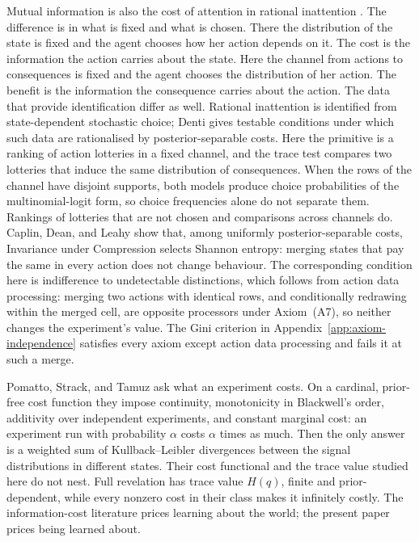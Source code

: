 \documentclass[11pt,a4paper]{article}
\theoremstyle{definition}
\newcommand{\Sh}{H}
\newcommand{\1}{\mathbf 1}
\begin{document}
Mutual information is also the cost of attention in rational inattention \cite{Sims2003,MatejkaMcKay2015}. The difference is in what is fixed and what is chosen. There the distribution of the state is fixed and the agent chooses how her action depends on it. The cost is the information the action carries about the state.  Here the channel from actions to consequences is fixed and the agent chooses the distribution of her action. The benefit is the information the consequence carries about
the action. The data that provide identification differ as
well.  Rational inattention is identified from state-dependent stochastic choice; Denti \cite{Denti2022} gives
testable conditions under which such data are rationalised by posterior-separable costs.  Here the primitive
is a ranking of action lotteries in a fixed channel, and the trace test compares two lotteries that induce the
same distribution of consequences.  When the rows of the channel have disjoint supports, both models produce
choice probabilities of the multinomial-logit form, so choice frequencies alone do not separate them.
Rankings of lotteries that are not chosen and comparisons across channels do.  Caplin, Dean, and Leahy
\cite{CaplinDeanLeahy2022} show that, among uniformly posterior-separable costs, Invariance under Compression
selects Shannon entropy: merging states that pay the same in every action does not change behaviour.  The
corresponding condition here is indifference to undetectable distinctions, which follows from action data
processing: merging two actions with identical rows, and conditionally redrawing within the merged cell,
are opposite processors under Axiom~\textup{(A7)}, so neither changes the experiment's value.  The Gini criterion in Appendix~\ref{app:axiom-independence} satisfies every
axiom except action data processing and fails it at such a merge.

Pomatto, Strack, and Tamuz \cite{PomattoStrackTamuz2023} ask what an experiment costs.  On a cardinal,
prior-free cost function they impose continuity, monotonicity in Blackwell's order, additivity over
independent experiments, and constant marginal cost: an experiment run with probability $\alpha$ costs
$\alpha$ times as much.  Then the only answer is a weighted sum of Kullback--Leibler divergences
between the signal distributions in different states.
Their cost functional and the trace value studied here do not nest.
Full revelation has trace value $\Sh(q)$, finite and prior-dependent, while every nonzero cost in their class
makes it infinitely costly.  The information-cost literature prices
learning about the world; the present paper prices being learned about.
\end{document}
